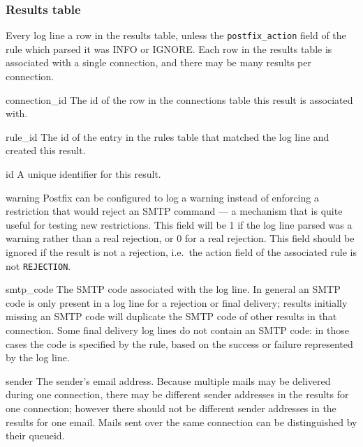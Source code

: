 \subsubsection{Results table}

\label{results table}

Every log line a row in the results table, unless the
\texttt{postfix\_action} field of the rule which parsed it was INFO or
IGNORE\@.  Each row in the results table is associated with a single
connection, and there may be many results per connection.

\begin{eqlist}

    \item [connection\_id] The id of the row in the connections table this
        result is associated with.

    \item [rule\_id] The id of the entry in the rules table that matched
        the log line and created this result.

    \item [id] A unique identifier for this result.

    \item [warning] Postfix can be configured to log a warning instead of
        enforcing a restriction that would reject an \gls{SMTP} command ---
        a mechanism that is quite useful for testing new restrictions.
        This field will be 1 if the log line parsed was a warning rather
        than a real rejection, or 0 for a real rejection.  This field
        should be ignored if the result is not a rejection, i.e.\ the
        action field of the associated rule is not \texttt{REJECTION}.

    \item [smtp\_code] The \gls{SMTP} code associated with the log line.
        In general an \gls{SMTP} code is only present in a log line for a
        rejection or final delivery; results initially missing an
        \gls{SMTP} code will duplicate the \gls{SMTP} code of other results
        in that connection.  Some final delivery log lines do not contain
        an \gls{SMTP} code: in those cases the code is specified by the
        rule, based on the success or failure represented by the log line.

    \item [sender] The sender's email address.  Because multiple mails may
        be delivered during one connection, there may be different sender
        addresses in the results for one connection; however there should
        not be different sender addresses in the results for one email.
        Mails sent over the same connection can be distinguished by their
        queueid.


\end{eqlist}
